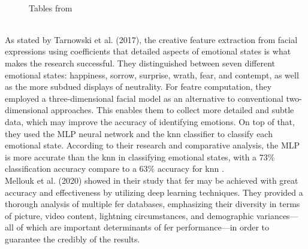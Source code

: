 \begin{figure}[!ht]
    \centering
    \qquad
    \vspace{0.5cm}
    \\
    \scriptsize{Tables from \citep{tarnowski_2017_emotion}}
\end{figure}
\\
\indent As stated by Tarnowski et al. (2017), the creative feature extraction from facial expressions using coefficients that detailed aspects of emotional states is what makes the research successful.
They distinguished between seven different emotional states: happiness, sorrow, surprise, wrath, fear, and contempt, as well as the more subdued displays of neutrality. 
For featre computation, they employed a three-dimensional facial model as an alternative to conventional two-dimensional approaches. 
This enables them to collect more detailed and subtle data, which may improve the accuracy of identifying emotions. 
On top of that, they used the MLP neural network and the \gls{knn} classifier to classify each emotional state. 
According to their research and comparative analysis, the MLP is more accurate than the \gls{knn} in classifying emotional states, with a 73\% classification accuracy compare to a 63\% accuracy for \gls{knn} \citep{tarnowski_2017_emotion}.
\\
\indent Mellouk et al. (2020) showed in their study that \gls{fer} may be achieved with great accuracy and effectiveness by utilizing deep learning techniques.
They provided a thorough analysis of multiple \gls{fer} databases, emphasizing their diversity in terms of picture, video content, lightning circumstances, and demographic variances—all of which are important determinants of \gls{fer} performance—in order to guarantee the credibly of the results.
